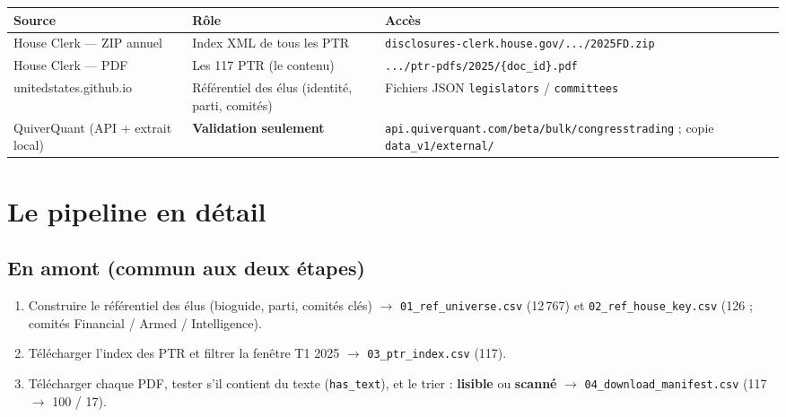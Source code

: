 \documentclass[11pt,a4paper]{article}
\newcommand{\file}[1]{\texttt{\small #1}}
\begin{document}
\begin{center}
\begin{tabular}{@{}p{3.3cm} p{4.3cm} >{\raggedright\arraybackslash}p{6.9cm}@{}}
\toprule
\textbf{Source} & \textbf{Rôle} & \textbf{Accès} \\
\midrule
House Clerk --- ZIP annuel & Index XML de tous les PTR & \nolinkurl{disclosures-clerk.house.gov/.../2025FD.zip} \\
House Clerk --- PDF & Les 117 PTR (le contenu) & \nolinkurl{.../ptr-pdfs/2025/{doc_id}.pdf} \\
unitedstates.github.io & Référentiel des élus (identité, parti, comités) & Fichiers JSON \texttt{legislators} / \texttt{committees} \\
QuiverQuant (API + extrait local) & \textbf{Validation seulement} & \nolinkurl{api.quiverquant.com/beta/bulk/congresstrading} ; copie \file{data\_v1/external/} \\
\bottomrule
\end{tabular}
\end{center}

\section{Le pipeline en détail}

\subsection*{En amont (commun aux deux étapes)}
\begin{enumerate}
  \item Construire le référentiel des élus (bioguide, parti, comités clés) $\to$
        \file{01\_ref\_universe.csv} (12\,767) et \file{02\_ref\_house\_key.csv} (126 ; comités
        Financial / Armed / Intelligence).
  \item Télécharger l'index des PTR et filtrer la fenêtre T1 2025 $\to$ \file{03\_ptr\_index.csv} (117).
  \item Télécharger chaque PDF, tester s'il contient du texte (\texttt{has\_text}), et le trier :
        \textbf{lisible} ou \textbf{scanné} $\to$ \file{04\_download\_manifest.csv} (117 $\to$ 100 / 17).
\end{enumerate}
\end{document}
